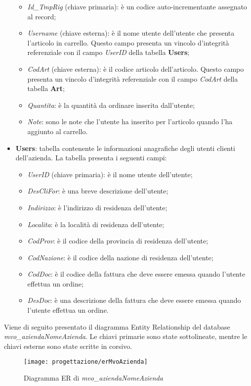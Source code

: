 \begin{itemize}
		\begin{itemize}
			\item \textit{Id\_TmpRig} (chiave primaria): è un codice auto-incrementante assegnato al record;
			\item \textit{Username} (chiave esterna): è il nome utente dell'utente che presenta l'articolo in carrello. Questo campo presenta un vincolo d'integrità referenziale con il campo \textit{UserID} della tabella \textbf{Users};
			\item \textit{CodArt} (chiave esterna): è il codice articolo dell'articolo. Questo campo presenta un vincolo d'integrità referenziale con il campo \textit{CodArt} della tabella \textbf{Art};
			\item \textit{Quantita}: è la quantità da ordinare inserita dall'utente;
			\item \textit{Note}: sono le note che l'utente ha inserito per l'articolo quando l'ha aggiunto al carrello.
		\end{itemize}
	\item \textbf{Users}: tabella contenente le informazioni anagrafiche degli utenti clienti dell'azienda. La tabella presenta i seguenti campi:
		\begin{itemize}
			\item \textit{UserID} (chiave primaria): è il nome utente dell'utente;
			\item \textit{DesCliFor}: è una breve descrizione dell'utente;
			\item \textit{Indirizzo}: è l'indirizzo di residenza dell'utente;
			\item \textit{Localita}: è la località di residenza dell'utente;
			\item \textit{CodProv}: è il codice della provincia di residenza dell'utente;
			\item \textit{CodNazione}: è il codice della nazione di residenza dell'utente;
			\item \textit{CodDoc}: è il codice della fattura che deve essere emessa quando l'utente effettua un ordine;
			\item \textit{DesDoc}: è una descrizione della fattura che deve essere emessa quando l'utente effettua un ordine.
		\end{itemize}
\end{itemize}
Viene di seguito presentato il diagramma Entity Relationship del database \textit{mvo\_aziendaNomeAzienda}. Le chiavi primarie sono state sottolineate, mentre le chiavi esterne sono state scritte in corsivo.

\begin{figure}[!h] 
    \centering 
    \texttt{[image: progettazione/erMvoAzienda]} 
    \caption{Diagramma ER di \textit{mvo\_aziendaNomeAzienda}}
\end{figure}

